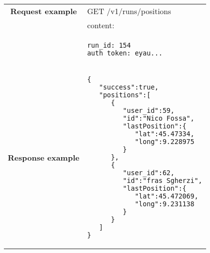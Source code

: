 \begin{adjustwidth}{1cm}{}
\begin{longtable}{|c|l|}
                               \textbf{Request example}
             & GET /v1/runs/positions \\
             & content: \\
            & \begin{minipage}[t]{0.5\textwidth}
                \begin{adjustwidth}{1.5cm}{}
                \begin{verbatim}
run_id: 154
auth_token: eyau...
                \end{verbatim}
                \end{adjustwidth}
              \end{minipage} \\
            \hline
             \textbf{Response example} & 
              \begin{minipage}[t]{0.5\textwidth}
                \begin{adjustwidth}{1.5cm}{}
                \begin{verbatim}
{
   "success":true,
   "positions":[
      {
         "user_id":59,
         "id":"Nico Fossa",
         "lastPosition":{
            "lat":45.47334,
            "long":9.228975
         }
      },
      {
         "user_id":62,
         "id":"fras Sgherzi",
         "lastPosition":{
            "lat":45.472069,
            "long":9.231138
         }
      }
   ]
}
                \end{verbatim}
                \end{adjustwidth}
              \end{minipage} \\
              \hline
 
 
 
            \end{longtable}
        \end{adjustwidth}
    
